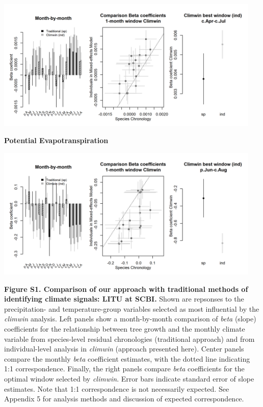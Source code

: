 \documentclass[
]{article}
\begin{document}
\includegraphics[width=0.95\textwidth,height=\textheight]{tables_figures/SI_figures/traditional_comparison/climwin_vs_dcc_SCBI_LITU_pre.png}

\textbf{Potential Evapotranspiration}

\includegraphics[width=0.95\textwidth,height=\textheight]{tables_figures/SI_figures/traditional_comparison/climwin_vs_dcc_SCBI_LITU_pet.png}

\textbf{Figure S1. Comparison of our approach with traditional methods
of identifying climate signals: LITU at SCBI.} Shown are repsonses to
the precipitation- and temperature-group variables selected as most
influential by the \emph{climwin} analysis. Left panels show a
month-by-month comparison of \emph{beta} (slope) coefficients for the
relationship between tree growth and the monthly climate variable from
species-level residual chronologies (traditional approach) and from
individual-level analysis in \emph{climwin} (approach presented here).
Center panels compare the monthly \emph{beta} coefficient estimates,
with the dotted line indicating 1:1 correspondence. Finally, the right
panels compare \emph{beta} coefficients for the optimal window selected
by \emph{climwin}. Error bars indicate standard error of slope
estimates. Note that 1:1 correspondence is not necessarily expected. See
Appendix 5 for analysis methods and discussion of expected
correspondence.
\end{document}
